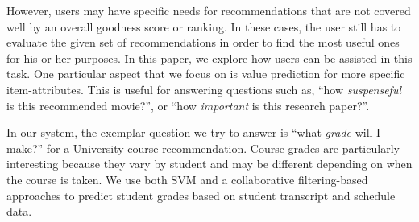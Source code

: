 \documentclass{article} %
\begin{document}
However, users may have specific needs for recommendations that are not covered well by an overall goodness score or ranking. In these cases, the user still has to evaluate the given set of recommendations in order to find the most useful ones for his or her purposes. In this paper, we explore how users can be assisted in this task. One particular aspect that we focus on is value prediction for more specific item-attributes. This is useful for answering questions such as, ``how \textit{suspenseful} is this recommended movie?'', or ``how \textit{important} is this research paper?''. 


In our system, the exemplar question we try to answer is ``what \textit{grade} will I make?'' for a University course recommendation. Course grades are particularly interesting because they vary by student and may be different depending on when the course is taken. We use both SVM and a collaborative filtering-based approaches to predict student grades based on student transcript and schedule data.





\end{document}
